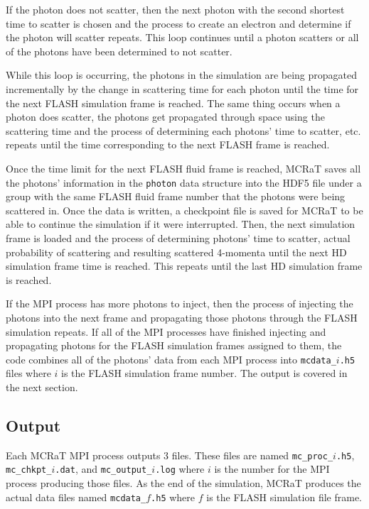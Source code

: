 \documentclass[12pt,a4paper]{article}
\begin{document}
If the photon does not scatter, then the next photon with the second shortest time to scatter is chosen and the process to create an electron and determine if the photon will scatter repeats. This loop continues until a photon scatters or all of the photons have been determined to not scatter. 

While this loop is occurring, the photons in the simulation are being propagated incrementally by the change in scattering time for each photon until the time for the next FLASH simulation frame is reached. The same thing occurs when a photon does scatter, the photons get propagated through space using the scattering time and the process of determining each photons' time to scatter, etc. repeats until the time corresponding to the next FLASH frame is reached.

Once the time limit for the next FLASH fluid frame is reached, MCRaT saves all the photons' information in the \texttt{photon} data structure into the HDF5 file under a group with the same FLASH fluid frame number that the photons were being scattered in. Once the data is written, a checkpoint file is saved for MCRaT to be able to continue the simulation if it were interrupted. Then, the next simulation frame is loaded and the process of determining photons' time to scatter, actual probability of scattering and resulting scattered 4-momenta until the next HD simulation frame time is reached. This repeats until the last HD simulation frame is reached. 

If the MPI process has more photons to inject, then the process of injecting the photons into the next frame and propagating those photons through the FLASH simulation repeats. If all of the MPI processes have finished injecting and propagating photons for the FLASH simulation frames assigned to them, the code combines all of the photons' data from each MPI process into \texttt{mcdata\_$i$.h5} files where $i$ is the FLASH simulation frame number. The output is covered in the next section.

\subsection{Output} 

Each MCRaT MPI process outputs 3 files. These files are named \texttt{mc\_proc\_$i$.h5}, \texttt{mc\_chkpt\_$i$.dat}, and \texttt{mc\_output\_$i$.log} where $i$ is the number for the MPI process producing those files. As the end of the simulation, MCRaT produces the actual data files named \texttt{mcdata\_$f$.h5} where $f$ is the FLASH simulation file frame.
\end{document}

